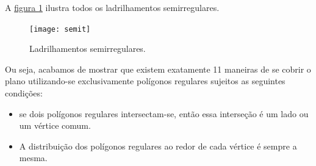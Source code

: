 A \hyperref[semit]{figura \ref{semit}} ilustra todos os ladrilhamentos semirregulares.


\begin{figure}[H]
\centering
\texttt{[image: semit]}
\caption{Ladrilhamentos semirregulares.}
\label{semit}
\end{figure}

Ou seja, acabamos de mostrar que existem exatamente 11 maneiras de se cobrir o plano utilizando-se exclusivamente polígonos regulares sujeitos as seguintes condições:
\begin{itemize}
\item se dois polígonos regulares intersectam-se, então essa interseção é um lado ou um vértice comum.
\item A distribuição dos polígonos regulares ao redor de cada vértice é sempre a mesma.
\end{itemize}




